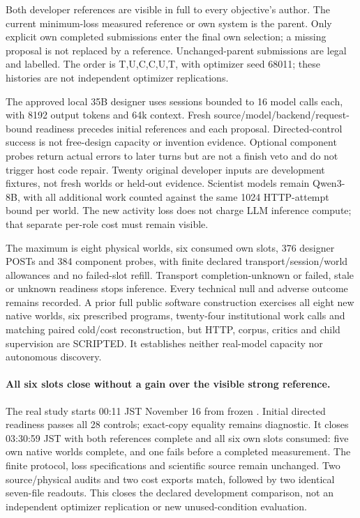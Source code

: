 Both developer references are visible in full to every objective's author.
The current minimum-loss measured reference or own system is the parent.
Only explicit own completed submissions enter the final own selection; a
missing proposal is not replaced by a reference. Unchanged-parent submissions
are legal and labelled. The order is T,U,C,C,U,T, with optimizer seed 68011;
these histories are not independent optimizer replications.

The approved local 35B designer uses sessions bounded to 16 model calls each, with
8192 output tokens and 64k context. Fresh source/model/backend/request-bound
readiness precedes initial references and each proposal. Directed-control
success is not free-design capacity or invention evidence. Optional component
probes return actual errors to later turns but are not a finish veto and do
not trigger host code repair. Twenty original developer inputs are development
fixtures, not fresh worlds or held-out evidence. Scientist models remain
Qwen3-8B, with all additional work counted against the same 1024 HTTP-attempt
bound per world. The new activity loss does not charge LLM inference compute;
that separate per-role cost must remain visible.

The maximum is eight physical worlds, six consumed own slots, 376 designer
POSTs and 384 component probes, with finite declared transport/session/world
allowances and no failed-slot refill. Transport completion-unknown or failed,
stale or unknown readiness stops inference. Every technical null and adverse
outcome remains recorded. A prior full public software construction exercises
all eight new native worlds, six prescribed programs, twenty-four institutional
work calls and matching paired cold/cost reconstruction, but HTTP, corpus,
critics and child supervision are SCRIPTED. It establishes neither real-model
capacity nor autonomous discovery.

\paragraph{All six slots close without a gain over the visible strong reference.}
The real study starts 00:11 JST November 16 from frozen . Initial directed
readiness passes all 28 controls; exact-copy equality remains diagnostic.
It closes 03:30:59 JST with both references complete and all six own slots
consumed: five own native worlds complete, and one fails before a completed
measurement. The finite protocol, loss specifications and scientific source
remain unchanged. Two source/physical audits and two cost exports match,
followed by two identical seven-file readouts. This closes the declared
development comparison, not an independent optimizer replication or new
unused-condition evaluation.

